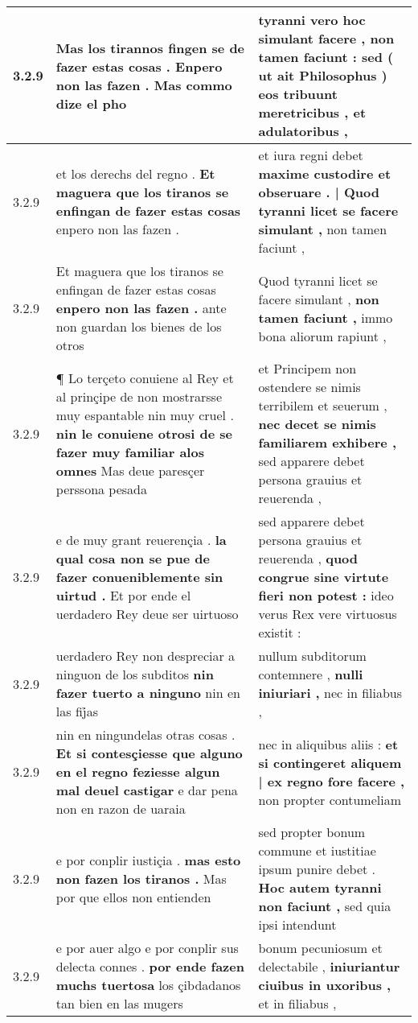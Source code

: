 \begin{tabular}{|p{1cm}|p{6.5cm}|p{6.5cm}|}
3.2.9 & Mas los tirannos fingen se de fazer estas cosas . \textbf{ Enpero non las fazen . } Mas commo dize el pho & tyranni vero hoc simulant facere , \textbf{ non tamen faciunt : } sed ( ut ait Philosophus ) eos tribuunt meretricibus , et adulatoribus , \\\hline
3.2.9 & et los derechs del regno . \textbf{ Et maguera que los tiranos se enfingan de fazer estas cosas } enpero non las fazen . & et iura regni debet \textbf{ maxime custodire et obseruare . | Quod tyranni licet se facere simulant , } non tamen faciunt , \\\hline
3.2.9 & Et maguera que los tiranos se enfingan de fazer estas cosas \textbf{ enpero non las fazen . } ante non guardan los bienes de los otros & Quod tyranni licet se facere simulant , \textbf{ non tamen faciunt , } immo bona aliorum rapiunt , \\\hline
3.2.9 & ¶ Lo terçeto conuiene al Rey et al prinçipe de non mostrarsse muy espantable nin muy cruel . \textbf{ nin le conuiene otrosi de se fazer muy familiar alos omnes } Mas deue paresçer perssona pesada & et Principem non ostendere se nimis terribilem et seuerum , \textbf{ nec decet se nimis familiarem exhibere , } sed apparere debet persona grauius et reuerenda , \\\hline
3.2.9 & e de muy grant reuerençia . \textbf{ la qual cosa non se pue de fazer conueniblemente sin uirtud . } Et por ende el uerdadero Rey deue ser uirtuoso & sed apparere debet persona grauius et reuerenda , \textbf{ quod congrue sine virtute fieri non potest : } ideo verus Rex vere virtuosus existit : \\\hline
3.2.9 & uerdadero Rey non despreciar a ninguon de los subditos \textbf{ nin fazer tuerto a ninguno } nin en las fij̉as & nullum subditorum contemnere , \textbf{ nulli iniuriari , } nec in filiabus , \\\hline
3.2.9 & nin en ningundelas otras cosas . \textbf{ Et si contesçiesse que alguno en el regno feziesse algun mal deuel castigar } e dar pena non en razon de uaraia & nec in aliquibus aliis : \textbf{ et si contingeret aliquem | ex regno fore facere , } non propter contumeliam \\\hline
3.2.9 & e por conplir iustiçia . \textbf{ mas esto non fazen los tiranos . } Mas por que ellos non entienden & sed propter bonum commune et iustitiae ipsum punire debet . \textbf{ Hoc autem tyranni non faciunt , } sed quia ipsi intendunt \\\hline
3.2.9 & e por auer algo e por conplir sus delecta connes . \textbf{ por ende fazen muchs tuertosa } los çibdadanos tan bien en las mugers & bonum pecuniosum et delectabile , \textbf{ iniuriantur ciuibus in uxoribus , } et in filiabus , \\\hline

\end{tabular}

